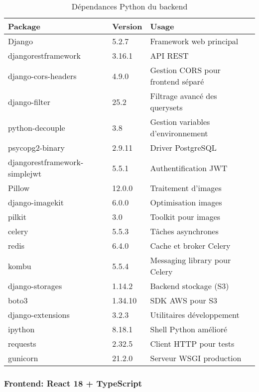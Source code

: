 \begin{table}[H]
\centering
\small
\begin{tabular}{|l|l|p{6cm}|}
\hline
\textbf{Package} & \textbf{Version} & \textbf{Usage} \\
\hline
Django & 5.2.7 & Framework web principal \\
djangorestframework & 3.16.1 & API REST \\
django-cors-headers & 4.9.0 & Gestion CORS pour frontend séparé \\
django-filter & 25.2 & Filtrage avancé des querysets \\
python-decouple & 3.8 & Gestion variables d'environnement \\
\hline
psycopg2-binary & 2.9.11 & Driver PostgreSQL \\
\hline
djangorestframework-simplejwt & 5.5.1 & Authentification JWT \\
\hline
Pillow & 12.0.0 & Traitement d'images \\
django-imagekit & 6.0.0 & Optimisation images \\
pilkit & 3.0 & Toolkit pour images \\
\hline
celery & 5.5.3 & Tâches asynchrones \\
redis & 6.4.0 & Cache et broker Celery \\
kombu & 5.5.4 & Messaging library pour Celery \\
\hline
django-storages & 1.14.2 & Backend stockage (S3) \\
boto3 & 1.34.10 & SDK AWS pour S3 \\
\hline
django-extensions & 3.2.3 & Utilitaires développement \\
ipython & 8.18.1 & Shell Python amélioré \\
\hline
requests & 2.32.5 & Client HTTP pour tests \\
\hline
gunicorn & 21.2.0 & Serveur WSGI production \\
\hline
\end{tabular}
\caption{Dépendances Python du backend}
\end{table}

\subsubsection{Frontend: React 18 + TypeScript}

